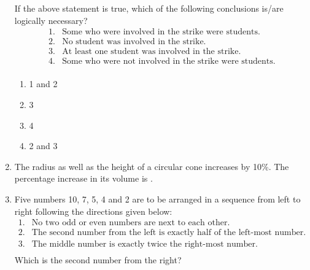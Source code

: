 \documentclass[journal]{IEEEtran}
\begin{document}
\begin{enumerate}
If the above statement is true, which of the following conclusions is/are logically 
necessary?
\begin{align*}
	1. &\text{Some who were involved in the strike were students.} \\
	2. &\text{No student was involved in the strike.} \\
	3. &\text{At least one student was involved in the strike.} \\
	4. &\text{Some who were not involved in the strike were students.} \\
\end{align*}
\begin{enumerate}
\item 1 and 2
\item 3
\item 4
\item 2 and 3
\end{enumerate}
\item The radius as well as the height of a circular cone increases by 10\%. The percentage increase in its volume is .\underline{\hspace{1cm}}
\begin{enumerate}
\end{enumerate}
\item Five numbers 10, 7, 5, 4 and 2 are to be arranged in a sequence from left to right following 
the directions given below:
\begin{align*}
	1. &\text{No two odd or even numbers are next to each other}. \\
	2. &\text{The second number from the left is exactly half of the left-most number.} \\
	3. &\text{The middle number is exactly twice the right-most number.} \\
\end{align*}
Which is the second number from the right?
\begin{enumerate}

\end{enumerate}
\end{enumerate}
\end{document}
